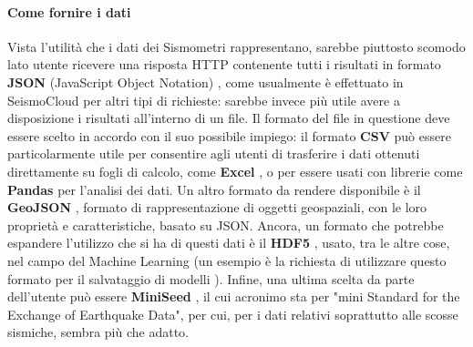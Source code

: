 \paragraph{Come fornire i dati}
Vista l'utilità che i dati dei Sismometri rappresentano, sarebbe piuttosto scomodo lato utente ricevere una risposta HTTP contenente tutti i risultati in formato \textbf{JSON} (JavaScript Object Notation) \cite{json}, come usualmente è effettuato in SeismoCloud per altri tipi di richieste: sarebbe invece più utile avere a disposizione i risultati all'interno di un file. Il formato del file in questione deve essere scelto in accordo con il suo possibile impiego: il formato \textbf{CSV} può essere particolarmente utile per consentire agli utenti di trasferire i dati ottenuti direttamente su fogli di calcolo, come \textbf{Excel} \cite{excel}, o per essere usati con librerie come \textbf{Pandas} \cite{pandas} per l'analisi dei dati. Un altro formato da rendere disponibile è il \textbf{GeoJSON} \cite{geojson}, formato di rappresentazione di oggetti geospaziali, con le loro proprietà e caratteristiche, basato su JSON. Ancora, un formato che potrebbe espandere l'utilizzo che si ha di questi dati è il \textbf{HDF5} \cite{hdf5}, usato, tra le altre cose, nel campo del Machine Learning (un esempio è la richiesta di utilizzare questo formato per il salvataggio di modelli \cite{tensorflow}). Infine, una ultima scelta da parte dell'utente può essere \textbf{MiniSeed} \cite{miniseed}, il cui acronimo sta per "mini Standard for the Exchange of Earthquake Data", per cui, per i dati relativi soprattutto alle scosse sismiche, sembra più che adatto. 

